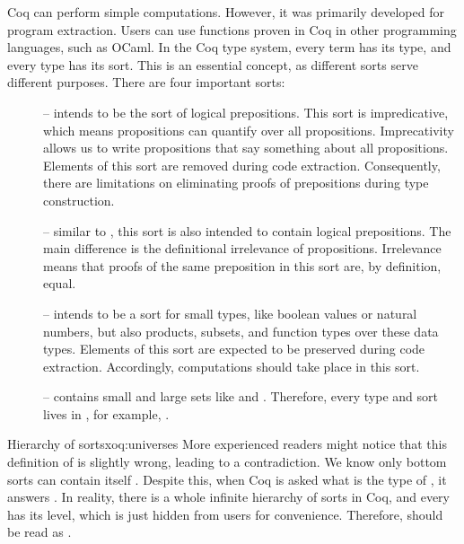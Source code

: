 Coq can perform simple computations. However, it was primarily developed for program extraction. Users can use functions proven in Coq in other programming languages, such as OCaml. In the Coq type system, every term has its type, and every type has its sort. This is an essential concept, as different sorts serve different purposes. There are four important sorts:

\begin{description}
\item[] -- intends to be the sort of logical prepositions. This sort is impredicative, which means propositions can quantify over all propositions. Imprecativity allows us to write propositions that say something about all propositions. Elements of this sort are removed during code extraction. Consequently, there are limitations on eliminating proofs of prepositions during type construction.

\item[] -- similar to , this sort is also intended to contain logical prepositions. The main difference is the definitional irrelevance of propositions. Irrelevance means that proofs of the same preposition in this sort are, by definition, equal.

\item[] -- intends to be a sort for small types, like boolean values or natural numbers, but also products, subsets, and function types over these data types. Elements of this sort are expected to be preserved during code extraction. Accordingly, computations should take place in this sort.

\item[] -- contains small and large sets like  and . Therefore, every type and sort lives in , for example, .
\end{description}

\begin{coq}{Hierarchy of sorts}{xoq:universes}
 More experienced readers might notice that this definition of  is slightly wrong, leading to a contradiction. We know only bottom sorts can contain itself \cite{TypeNotInType}. Despite this, when Coq is asked what is the type of , it answers . In reality, there is a whole infinite hierarchy of sorts in Coq, and every  has its level, which is just hidden from users for convenience. Therefore,  should be read as .
\end{coq}


